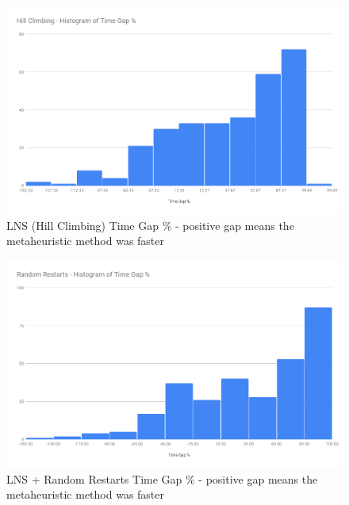 \begin{figure}[!htbp]
    \centering
    \includegraphics[width=\textwidth]{Figures/Metaheuristics/hill_climb_time_gap.png}
    \caption{LNS (Hill Climbing) Time Gap \% - positive gap means the metaheuristic method was faster}
    \label{fig:time_gap_perc_hill_climb}
\end{figure}

\begin{figure}[!htbp]
    \centering
    \includegraphics[width=\textwidth]{Figures/Metaheuristics/restarts_time_gap.png}
    \caption{LNS + Random Restarts Time Gap \% - positive gap means the metaheuristic method was faster}
    \label{fig:time_gap_perc_restarts}
\end{figure}

